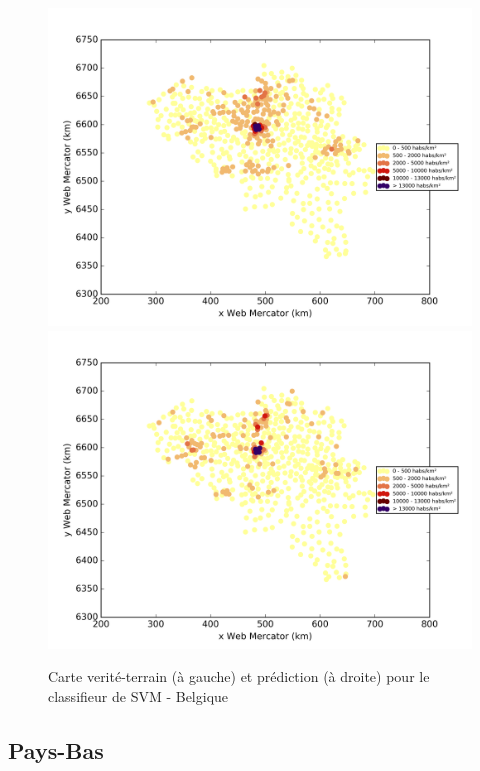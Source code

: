 \documentclass{book}
\begin{document}
\begin{figure}[H]
\centerline{
\includegraphics[scale=0.5]{../../data/Belgique/test/Support_Vector_Gaussian_Classification/Support_Vector_Gaussian_Classification/density_ground_truth.png}
\includegraphics[scale=0.5]{../../data/Belgique/test/Support_Vector_Gaussian_Classification/Support_Vector_Gaussian_Classification/density_classification.png}
}
\caption{Carte verité-terrain (à gauche) et prédiction (à droite) pour le classifieur de SVM - Belgique}
\label{svm_carte_belgique}
\end{figure}


\subsection{Pays-Bas}
\end{document}
